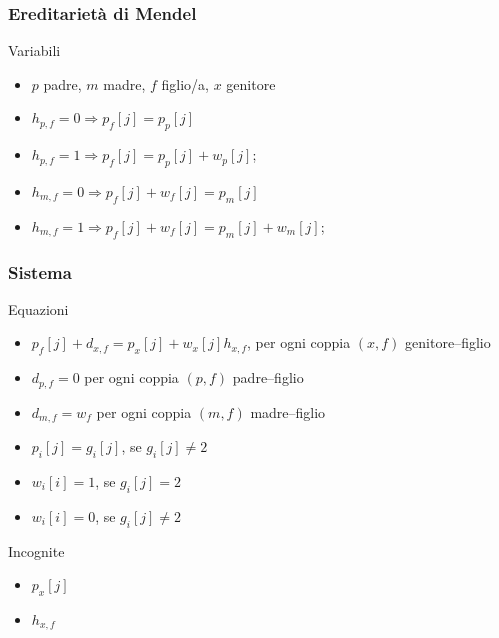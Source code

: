 \begin{frame}
\frametitle{Ereditarietà di Mendel}
\begin{block}{Variabili}
\begin{itemize}
\item
$p$ padre, $m$ madre, $f$ figlio/a, $x$ genitore
\item
$h_{p,f}=0 \Rightarrow p_{f}[j] = p_{p}[j]$
\item
$h_{p,f}=1 \Rightarrow p_{f}[j] = p_{p}[j]  + w_{p}[j]$;
\item
$h_{m,f}=0 \Rightarrow p_{f}[j] + w_{f}[j] = p_{m}[j]$
\item
$h_{m,f}=1 \Rightarrow p_{f}[j] + w_{f}[j]  = p_{m}[j]  + w_{m}[j]$;
\end{itemize}
\end{block}
\end{frame}

\begin{frame}
\frametitle{Sistema}
\begin{block}{Equazioni}
\begin{itemize}
\item
$p_{f}[j] + d_{x,f} = p_{x}[j]  + w_{x}[j] h_{x,f}$, per ogni coppia $(x,f)$ genitore--figlio
\item
$d_{p,f}=0$ per ogni coppia $(p,f)$ padre--figlio
\item
$d_{m,f} = w_{f}$ per ogni coppia $(m,f)$ madre--figlio
\item
$p_{i}[j] = g_{i}[j]$, se $g_{i}[j] \neq 2$
\item
$w_{i}[i] = 1$, se $g_{i}[j] = 2$
\item
$w_{i}[i] = 0$, se $g_{i}[j] \neq 2$
\end{itemize}
\end{block}
\begin{block}{Incognite}
\begin{itemize}
\item
$p_{x}[j]$
\item
$h_{x,f}$
\end{itemize}
\end{block}
\end{frame}

